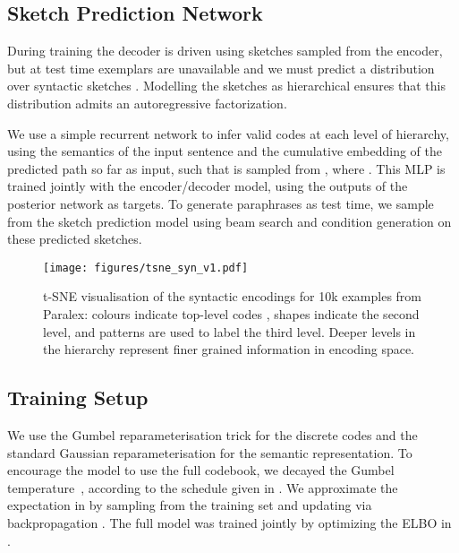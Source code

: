 \documentclass[11pt]{article}
\begin{document}
\subsection{Sketch Prediction Network}

During training the decoder is driven using sketches sampled from the encoder, but at test time exemplars are unavailable and we must predict a distribution over syntactic sketches . Modelling the sketches as hierarchical ensures that this distribution admits an autoregressive factorization.



We use a simple recurrent network to infer valid codes at each level of hierarchy, using the semantics of the input sentence and the cumulative embedding of the predicted path so far as input, such that
 is sampled from  , where . This MLP is trained jointly with the encoder/decoder model, using the outputs of the posterior network  as targets.
To generate paraphrases as test time, we sample from the sketch prediction model  using beam search and condition generation on these predicted sketches.





\begin{figure*}[ht!]
    \centering
    \texttt{[image: figures/tsne\_syn\_v1.pdf]}
\caption{t-SNE visualisation of the syntactic encodings  for 10k examples from Paralex: colours indicate top-level codes , shapes indicate the second level, and patterns are used to label the third level. Deeper levels in the hierarchy represent finer grained information in encoding space.}
    \vspace{-0.4cm}
    \label{fig:tsne}
\end{figure*}


\subsection{Training Setup}
\label{sec:training}

We use the Gumbel reparameterisation trick
\cite{jang2016categorical,maddison2017concrete,sonderby2017continuous}
for the discrete codes and the standard Gaussian reparameterisation
for the semantic representation. To encourage the model to use the full codebook, we decayed the Gumbel temperature~, according to the schedule given in . We approximate the expectation in
 by sampling from the training set and
updating via backpropagation \cite{kingma2013autoencoding}. The full model was trained jointly by optimizing the ELBO in .
\end{document}
